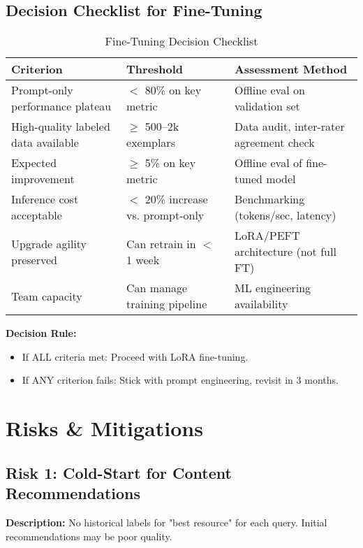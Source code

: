\documentclass[11pt,letterpaper]{article}
\begin{document}
\subsection{Decision Checklist for Fine-Tuning}

\begin{table}[H]
\centering
\small
\begin{tabular}{@{}p{5cm}p{3cm}p{6cm}@{}}
\toprule
\textbf{Criterion} & \textbf{Threshold} & \textbf{Assessment Method} \\
\midrule
Prompt-only performance plateau & $<$ 80\% on key metric & Offline eval on validation set \\
High-quality labeled data available & $\geq$ 500--2k exemplars & Data audit, inter-rater agreement check \\
Expected improvement & $\geq$ 5\% on key metric & Offline eval of fine-tuned model \\
Inference cost acceptable & $<$ 20\% increase vs. prompt-only & Benchmarking (tokens/sec, latency) \\
Upgrade agility preserved & Can retrain in $<$ 1 week & LoRA/PEFT architecture (not full FT) \\
Team capacity & Can manage training pipeline & ML engineering availability \\
\bottomrule
\end{tabular}
\caption{Fine-Tuning Decision Checklist}
\end{table}

\textbf{Decision Rule:}
\begin{itemize}
\item If ALL criteria met: Proceed with LoRA fine-tuning.
\item If ANY criterion fails: Stick with prompt engineering, revisit in 3 months.
\end{itemize}

\newpage

\section{Risks \& Mitigations}

\subsection{Risk 1: Cold-Start for Content Recommendations}

\textbf{Description:} No historical labels for "best resource" for each query. Initial recommendations may be poor quality.
\end{document}

